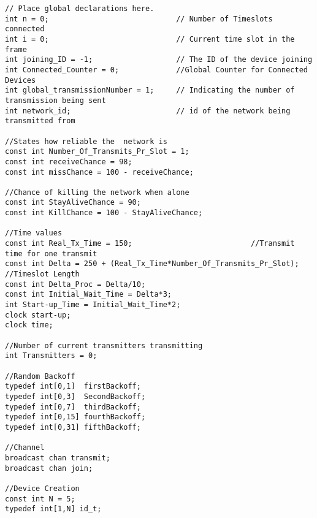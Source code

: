 \begin{lstlisting}[style=UPPAAL,
caption={Code for the global declarations in CCUC}]
// Place global declarations here.
int n = 0;                             // Number of Timeslots connected
int i = 0;                             // Current time slot in the frame
int joining_ID = -1;                   // The ID of the device joining       
int Connected_Counter = 0;             //Global Counter for Connected Devices
int global_transmissionNumber = 1;     // Indicating the number of transmission being sent
int network_id;                        // id of the network being transmitted from

//States how reliable the  network is
const int Number_Of_Transmits_Pr_Slot = 1;
const int receiveChance = 98;
const int missChance = 100 - receiveChance;

//Chance of killing the network when alone
const int StayAliveChance = 90;
const int KillChance = 100 - StayAliveChance;

//Time values
const int Real_Tx_Time = 150;                           //Transmit time for one transmit
const int Delta = 250 + (Real_Tx_Time*Number_Of_Transmits_Pr_Slot);    //Timeslot Length
const int Delta_Proc = Delta/10;
const int Initial_Wait_Time = Delta*3;
int Start-up_Time = Initial_Wait_Time*2;
clock start-up;
clock time;

//Number of current transmitters transmitting
int Transmitters = 0;

//Random Backoff
typedef int[0,1]  firstBackoff;
typedef int[0,3]  SecondBackoff;
typedef int[0,7]  thirdBackoff;
typedef int[0,15] fourthBackoff;
typedef int[0,31] fifthBackoff;

//Channel
broadcast chan transmit;
broadcast chan join;

//Device Creation
const int N = 5;
typedef int[1,N] id_t;
\end{lstlisting}
